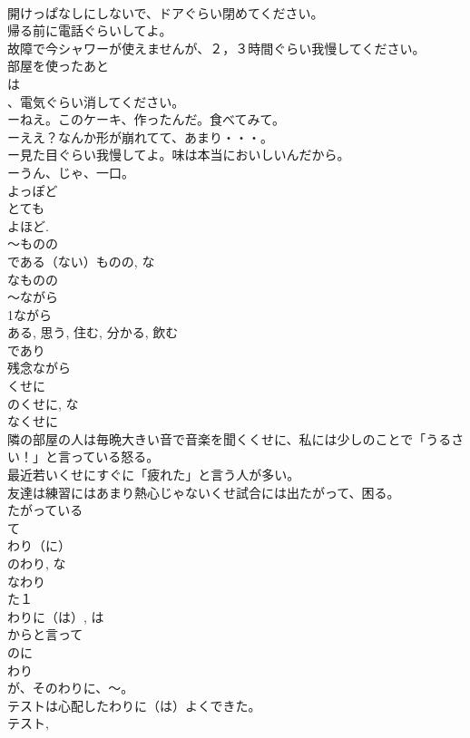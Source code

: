\documentclass[8pt]{extreport}
\begin{document}
\begin{CJK}{UTF8}{min}
\\	開けっぱなしにしないで、ドアぐらい閉めてください。
\\	帰る前に電話ぐらいしてよ。
\\	故障で今シャワーが使えませんが、２，３時間ぐらい我慢してください。
\\	部屋を使ったあと
\\	は
\\	、電気ぐらい消してください。
\\	ーねえ。このケーキ、作ったんだ。食べてみて。
\\	ーええ？なんか形が崩れてて、あまり・・・。
\\	ー見た目ぐらい我慢してよ。味は本当においしいんだから。
\\	ーうん、じゃ、一口。
\\	よっぽど
\\	とても
\\	よほど.
\\	～ものの
\\	である（ない）ものの, な
\\	なものの
\\	～ながら
\\	1ながら
\\	ある, 思う, 住む, 分かる, 飲む
\\	であり
\\	残念ながら
\\	くせに
\\	のくせに, な
\\	なくせに
\\	隣の部屋の人は毎晩大きい音で音楽を聞くくせに、私には少しのことで「うるさい！」と言っている怒る。
\\	最近若いくせにすぐに「疲れた」と言う人が多い。
\\	友達は練習にはあまり熱心じゃないくせ試合には出たがって、困る。
\\	たがっている 
\\	て 
\\	わり（に）
\\	のわり, な
\\	なわり
\\	た１
\\	わりに（は）, は 
\\	からと言って 
\\	のに 
\\	わり 
\\	が、そのわりに、～。　
\\	テストは心配したわりに（は）よくできた。
\\	テスト, 

\end{CJK}
\end{document}
